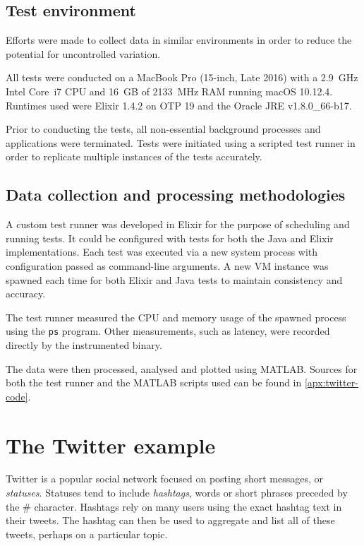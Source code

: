 \subsection{Test environment}\label{sec:eval:approach:environment}

Efforts were made to collect data in similar environments in order to reduce the potential for uncontrolled variation.

All tests were conducted on a MacBook Pro (15-inch, Late 2016) with a \SI{2.9}{\giga\hertz} Intel Core~i7 CPU and \SI{16}{GB} of \SI{2133}{\mega\hertz} RAM running macOS 10.12.4.
Runtimes used were Elixir 1.4.2 on OTP 19 and the Oracle JRE v1.8.0\_66-b17.

Prior to conducting the tests, all non-essential background processes and applications were terminated.
Tests were initiated using a scripted test runner in order to replicate multiple instances of the tests accurately.

\subsection{Data collection and processing methodologies}\label{sec:eval:approach:collection}

A custom test runner was developed in Elixir for the purpose of scheduling and running tests.
It could be configured with tests for both the Java and Elixir implementations.
Each test was executed via a new system process with configuration passed as command-line arguments.
A new VM instance was spawned each time for both Elixir and Java tests to maintain consistency and accuracy.

The test runner measured the CPU and memory usage of the spawned process using the \verb|ps| program.
Other measurements, such as latency, were recorded directly by the instrumented binary.

The data were then processed, analysed and plotted using MATLAB.
Sources for both the test runner and the MATLAB scripts used can be found in \cref{apx:twitter-code}.

\section{The Twitter example}\label{sec:eval:approach:twitter}

Twitter is a popular social network focused on posting short messages, or \emph{statuses}.
Statuses tend to include \emph{hashtags}, words or short phrases preceded by the \# character.
Hashtags rely on many users using the exact hashtag text in their tweets.
The hashtag can then be used to aggregate and list all of these tweets, perhaps on a particular topic.

